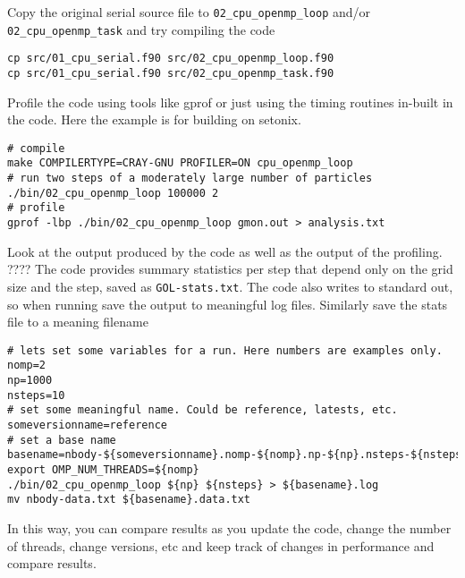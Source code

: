 \documentclass[11pt]{amsart}
\begin{document}
Copy the original serial source file to \texttt{02\_cpu\_openmp\_loop} and/or \texttt{02\_cpu\_openmp\_task} and try compiling the code
\begin{center}
\begin{minipage}{0.95\textwidth}
\begin{verbatim}
cp src/01_cpu_serial.f90 src/02_cpu_openmp_loop.f90
cp src/01_cpu_serial.f90 src/02_cpu_openmp_task.f90
\end{verbatim}
\end{minipage}
\end{center}
Profile the code using tools like gprof or just using the timing routines in-built in the code. 
Here the example is for building on setonix.
\begin{center}
\begin{minipage}{0.95\textwidth}
\begin{verbatim}
# compile
make COMPILERTYPE=CRAY-GNU PROFILER=ON cpu_openmp_loop
# run two steps of a moderately large number of particles 
./bin/02_cpu_openmp_loop 100000 2
# profile
gprof -lbp ./bin/02_cpu_openmp_loop gmon.out > analysis.txt
\end{verbatim}
\end{minipage}
\end{center}
Look at the output produced by the code as well as the output of the profiling.
????
The code provides summary statistics per step that depend only on the grid size and the step, saved as {\color{blue}\texttt{GOL-stats.txt}}. The code also writes to standard out, so when running save the output to meaningful log files. Similarly save the stats file to a meaning filename
\begin{center}
\begin{minipage}{0.95\textwidth}
\begin{verbatim}
# lets set some variables for a run. Here numbers are examples only.
nomp=2
np=1000
nsteps=10
# set some meaningful name. Could be reference, latests, etc.
someversionname=reference
# set a base name
basename=nbody-${someversionname}.nomp-${nomp}.np-${np}.nsteps-${nsteps}
export OMP_NUM_THREADS=${nomp}
./bin/02_cpu_openmp_loop ${np} ${nsteps} > ${basename}.log
mv nbody-data.txt ${basename}.data.txt
\end{verbatim}
\end{minipage}
\end{center}
In this way, you can compare results as you update the code, change the number of threads, change versions, etc and keep track of changes in performance and compare results.
\end{document}
